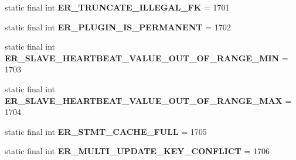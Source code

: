 \begin{DoxyCompactItemize}
\item 
\mbox{\label{classcom_1_1mysql_1_1cj_1_1exceptions_1_1_mysql_error_numbers_aeb50cc484f0bd74b46141f06aebbc6a2}} 
static final int {\bfseries E\+R\+\_\+\+T\+R\+U\+N\+C\+A\+T\+E\+\_\+\+I\+L\+L\+E\+G\+A\+L\+\_\+\+FK} = 1701
\item 
\mbox{\label{classcom_1_1mysql_1_1cj_1_1exceptions_1_1_mysql_error_numbers_a5df36d165d5f22cc0382485c04be7d48}} 
static final int {\bfseries E\+R\+\_\+\+P\+L\+U\+G\+I\+N\+\_\+\+I\+S\+\_\+\+P\+E\+R\+M\+A\+N\+E\+NT} = 1702
\item 
\mbox{\label{classcom_1_1mysql_1_1cj_1_1exceptions_1_1_mysql_error_numbers_a8e3010262f3d83d35937c80de77f5c7c}} 
static final int {\bfseries E\+R\+\_\+\+S\+L\+A\+V\+E\+\_\+\+H\+E\+A\+R\+T\+B\+E\+A\+T\+\_\+\+V\+A\+L\+U\+E\+\_\+\+O\+U\+T\+\_\+\+O\+F\+\_\+\+R\+A\+N\+G\+E\+\_\+\+M\+IN} = 1703
\item 
\mbox{\label{classcom_1_1mysql_1_1cj_1_1exceptions_1_1_mysql_error_numbers_ab60e9cab23dcd69d9d4826ad76f68e84}} 
static final int {\bfseries E\+R\+\_\+\+S\+L\+A\+V\+E\+\_\+\+H\+E\+A\+R\+T\+B\+E\+A\+T\+\_\+\+V\+A\+L\+U\+E\+\_\+\+O\+U\+T\+\_\+\+O\+F\+\_\+\+R\+A\+N\+G\+E\+\_\+\+M\+AX} = 1704
\item 
\mbox{\label{classcom_1_1mysql_1_1cj_1_1exceptions_1_1_mysql_error_numbers_a68a04fd1e51ca236d79e105733167fcf}} 
static final int {\bfseries E\+R\+\_\+\+S\+T\+M\+T\+\_\+\+C\+A\+C\+H\+E\+\_\+\+F\+U\+LL} = 1705
\item 
\mbox{\label{classcom_1_1mysql_1_1cj_1_1exceptions_1_1_mysql_error_numbers_afdd46e36b7685d53ba34bd432d9dc7f7}} 
static final int {\bfseries E\+R\+\_\+\+M\+U\+L\+T\+I\+\_\+\+U\+P\+D\+A\+T\+E\+\_\+\+K\+E\+Y\+\_\+\+C\+O\+N\+F\+L\+I\+CT} = 1706
\item 
\mbox{\label{classcom_1_1mysql_1_1cj_1_1exceptions_1_1_mysql_error_numbers_a03d4857332f7068ee4978a51f103f278}} 

\end{DoxyCompactItemize}
